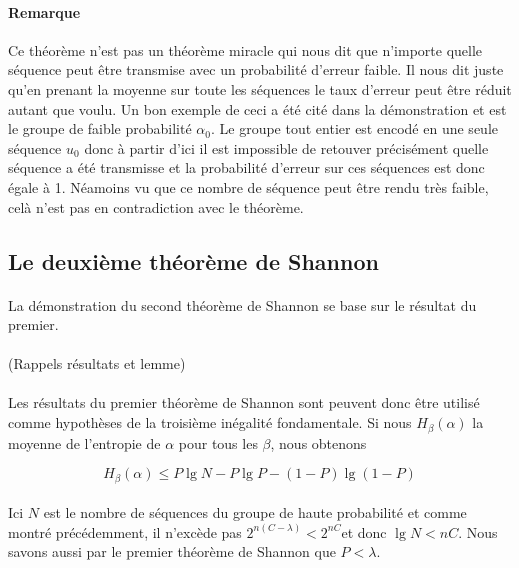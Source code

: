 	\paragraph{Remarque}
	Ce théorème n'est pas un théorème miracle qui nous dit que n'importe quelle
	séquence peut être transmise avec un probabilité d'erreur faible.
	Il nous dit juste qu'en prenant la moyenne sur toute les séquences le taux 
	d'erreur peut être réduit autant que voulu. Un bon exemple
	de ceci a été cité dans la démonstration et est le groupe de faible 
	probabilité $\alpha_0$. Le groupe tout entier est encodé en une 
	seule séquence $u_0$ donc à partir d'ici il est impossible de retouver 
	précisément quelle séquence a été transmisse et la probabilité
	d'erreur sur ces séquences est donc égale à 1. Néamoins vu que ce nombre 
	de séquence peut être rendu très faible, celà n'est pas en 
	contradiction avec le théorème.
	
\subsection{Le deuxième théorème de Shannon}

	\paragraph{}La démonstration du second théorème de Shannon se base sur le 
	résultat du premier. 
	
	\paragraph{}
	(Rappels résultats et lemme)
	
	\paragraph{}
	Les résultats du premier théorème de Shannon sont peuvent donc être utilisé 
	comme hypothèses de la troisième inégalité fondamentale.
	Si nous $H_\beta(\alpha)$ la moyenne de l'entropie de $\alpha$ pour tous
	les	$\beta$, nous obtenons
	
	\[H_\beta(\alpha)\le P\lg N - P\lg P - (1-P)\lg(1-P)\]
	
	\paragraph{}
	Ici $N$ est le nombre de séquences du groupe de haute probabilité et comme 
	montré précédemment, il n'excède pas $2^{n(C-\lambda)}<2^{nC}$et donc 
	$\lg N<nC$. Nous savons aussi par le premier théorème de Shannon 
	que $P<\lambda$.
	
